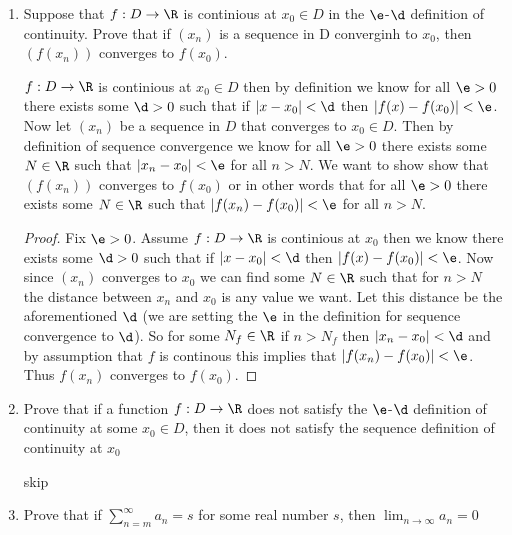 \documentclass[11pt]{exam}
\newcommand{\qs}{\sum_{n=m}^{\infty}}
\begin{document}
\begin{enumerate}
\begin{solution}
            \end{solution}
        \item Suppose that $f: D \to \R$ is continious at $x_0 \in D$ in the $\e$-$\d$ definition of 
            continuity. Prove that if $(x_n)$ is a sequence in D converginh to $x_0$, then $(f(x_n))$ 
            converges to $f(x_0)$.
            \begin{solution}
                $f: D \to \R$ is continious at $x_0 \in D$ then by definition we know for all $\e > 0$ 
                there exists some $\d > 0$ such that if $|x-x_0| < \d$ then $|f(x) -f(x_0)| < \e$. Now 
                let $(x_n)$ be a sequence in $D$ that converges to $x_0 \in D$. Then by definition of 
                sequence convergence we know for all $\e > 0$ there exists some $N \in \R$ such that 
                $|x_n - x_0| < \e$ for all $n > N$. We want to show show that $(f(x_n))$ converges to $f(x_0)$ or in other words that for all $\e > 0$ there exists some $N \in \R$ such that 
                $|f(x_n) - f(x_0)| < \e$ for all $n > N$.
                \begin{proof}
                    Fix $\e > 0$. Assume $f: D \to \R$ is continious at $x_0$ then we know there exists 
                    some $\d > 0$ such that if $|x-x_0| < \d$ then $|f(x)-f(x_0)| < \e$. Now since 
                    $(x_n)$ converges to $x_0$ we can find some $N \in \R$ such that for $n > N$ the 
                    distance between $x_n$ and $x_0$ is any value we want. Let this distance be the 
                    aforementioned $\d$ (we are setting the $\e$ in the definition for sequence 
                    convergence to $\d$). So for some $N_f \in \R$ if $n > N_f$ then $|x_n - x_0| < \d$
                    and by assumption that $f$ is continous this implies that $|f(x_n)-f(x_0)| < \e$. Thus $f(x_n)$ converges to $f(x_0)$.
                \end{proof}
            \end{solution}
        \item Prove that if a function $f: D \to \R$ does not satisfy the $\e$-$\d$ definition of 
        continuity at some $x_0 \in D$, then it does not satisfy the sequence definition of continuity
        at $x_0$
            \begin{solution}
                skip
            \end{solution}
        \item Prove that if $\qs a_n = s$ for some real number $s$, then $\lim_{n \to \infty} a_n = 0$ 
            \begin{solution}

\end{solution}
\end{enumerate}
\end{document}
